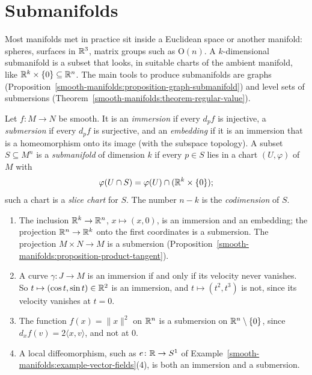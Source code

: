 \section{Submanifolds}\label{smooth-manifolds:section-submanifolds}

Most manifolds met in practice sit inside a Euclidean space or another manifold: spheres, surfaces in $\mathbb{R}^3$, matrix groups such as $\mathrm{O}(n)$. A
$k$-dimensional submanifold is a subset that looks, in suitable charts of the ambient manifold, like $\mathbb{R}^k \times \{0\} \subseteq \mathbb{R}^n$. The main tools
to produce submanifolds are graphs (Proposition~\ref{smooth-manifolds:proposition-graph-submanifold}) and level sets of submersions
(Theorem~\ref{smooth-manifolds:theorem-regular-value}).

\begin{definition}\label{smooth-manifolds:definition-immersion}
Let $f \colon M \to N$ be smooth. It is an \emph{immersion} if every $d_pf$ is injective, a \emph{submersion} if every $d_pf$ is surjective, and an
\emph{embedding} if it is an immersion that is a homeomorphism onto its image (with the subspace topology). A subset $S \subseteq M^n$ is a
\emph{submanifold} of dimension $k$ if every $p \in S$ lies in a chart $(U, \varphi)$ of $M$ with
\[
\varphi(U \cap S) = \varphi(U) \cap (\mathbb{R}^k \times \{0\});
\]
such a chart is a \emph{slice chart} for $S$. The number $n - k$ is the \emph{codimension} of $S$.
\end{definition}

\begin{example}\label{smooth-manifolds:example-immersions}
\begin{enumerate}
\item The inclusion $\mathbb{R}^k \to \mathbb{R}^n$, $x \mapsto (x, 0)$, is an immersion and an embedding; the projection $\mathbb{R}^n \to \mathbb{R}^k$ onto the first coordinates is a
submersion. The projection $M \times N \to M$ is a submersion (Proposition~\ref{smooth-manifolds:proposition-product-tangent}).
\item A curve $\gamma \colon J \to M$ is an immersion if and only if its velocity never vanishes. So $t \mapsto (\cos t, \sin t) \in \mathbb{R}^2$ is an immersion,
and $t \mapsto (t^2, t^3)$ is not, since its velocity vanishes at $t = 0$.
\item The function $f(x) = \|x\|^2$ on $\mathbb{R}^n$ is a submersion on $\mathbb{R}^n \setminus \{0\}$, since $d_xf(v) = 2\langle x, v\rangle$, and not at $0$.
\item A local diffeomorphism, such as $e \colon \mathbb{R} \to S^1$ of Example~\ref{smooth-manifolds:example-vector-fields}(4), is both an immersion and a
submersion.
\end{enumerate}
\end{example}

